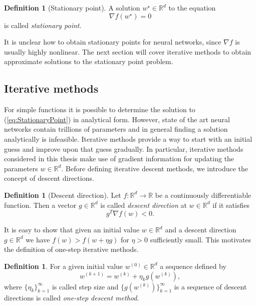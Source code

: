 \documentclass[12pt]{article}
\theoremstyle{definition}
\newtheorem{definition}[theorem]{Definition}
\numberwithin{equation}{section}
\begin{document}
\begin{definition}[Stationary point]
  A solution $w^\star \in \mathbb{R}^d$ to the equation
  \begin{equation}
  \label{eq:StationaryPoint}
    \nabla f(w^\star) = 0
  \end{equation}
  is called \emph{stationary point}.
\end{definition}
It is unclear how to obtain stationary points for neural networks, since $\nabla f$ is usually highly nonlinear. The next section will cover iterative methods to obtain approximate solutions to the stationary point problem.

\subsection{Iterative methods}
For simple functions it is possible to determine the solution to (\ref*{eq:StationaryPoint}) in analytical form. However, state of the art neural networks contain trillions of parameters and in general finding a solution analytically is infeasible. Iterative methods provide a way to start with an initial guess and improve upon that guess gradually. In particular, iterative methods considered in this thesis make use of gradient information for updating the parameters $w \in \mathbb{R}^d$. Before defining iterative descent methods, we introduce the concept of descent directions. 
\begin{definition}[Descent direction]
  Let $f: \mathbb{R}^d \rightarrow \mathbb{R}$ be a continuously differentiable function. Then a vector $g \in \mathbb{R}^d$ is called \emph{descent direction} at $w \in \mathbb{R}^d$ if it satisfies 
  \begin{equation}
    g^T \nabla f(w) < 0.
  \end{equation} 
\end{definition}
It is easy to show that given an initial value $w \in \mathbb{R}^d$ and a descent direction $g \in \mathbb{R}^d$ we have $f(w) > f(w + \eta g)$ for $\eta > 0$ sufficiently small. This motivates the definition of one-step iterative methods.
\begin{definition}
  For a given initial value $w^{(0)}\in \mathbb{R}^d$ a sequence defined by
\begin{equation}
  w^{(k+1)} = w^{(k)} + \eta_k g(w^{(k)}),
\end{equation}
  where $\{\eta_k\}_{k=1}^\infty$ is called step size and $\{g(w^{(k)})\}_{k=1}^\infty$ is a sequence of descent directions is called \emph{one-step descent method}.
\end{definition}
\end{document}
